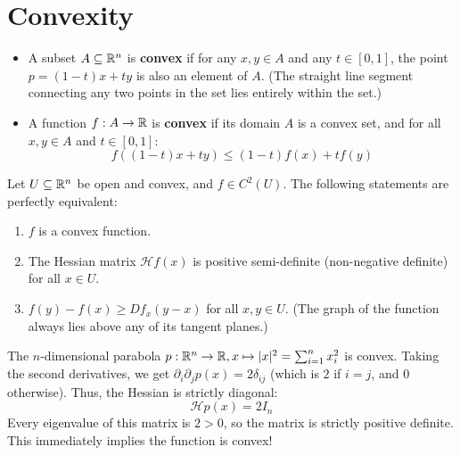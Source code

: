 \setcounter{section}{5} %

\section{Convexity}

\begin{definition*}
\begin{itemize}
    \item A subset $A \subseteq \mathbb{R}^n$ is \textbf{convex} if for any $x, y \in A$ and any $t \in [0,1]$, the point $p = (1-t)x + ty$ is also an element of $A$. \textcolor{eGray}{(The straight line segment connecting any two points in the set lies entirely within the set.)}
    
    \item A function $f: A \to \mathbb{R}$ is \textbf{convex} if its domain $A$ is a convex set, and for all $x, y \in A$ and $t \in [0,1]$:
    \[ f((1-t)x + ty) \le (1-t)f(x) + t f(y) \]
\end{itemize}
\end{definition*}


\begin{proposition*}
Let $U \subseteq \mathbb{R}^n$ be open and convex, and $f \in C^2(U)$. The following statements are perfectly equivalent:
\begin{enumerate}
    \item $f$ is a convex function.
    \item The Hessian matrix $\mathscr{H}f(x)$ is positive semi-definite (non-negative definite) for all $x \in U$.
    \item $f(y) - f(x) \ge Df_x(y-x)$ for all $x, y \in U$. \textcolor{eGray}{(The graph of the function always lies above any of its tangent planes.)}
\end{enumerate}
\end{proposition*}

\begin{example*}
The $n$-dimensional parabola $p: \mathbb{R}^n \to \mathbb{R}, x \mapsto \lvert x\rvert^2 = \sum_{i=1}^n x_i^2$ is convex. 
Taking the second derivatives, we get $\partial_i \partial_j p(x) = 2\delta_{ij}$ (which is $2$ if $i=j$, and $0$ otherwise). Thus, the Hessian is strictly diagonal:
\[ \mathscr{H}p(x) = 2 I_n \]
Every eigenvalue of this matrix is $2 > 0$, so the matrix is strictly positive definite. This immediately implies the function is convex!
\end{example*}

